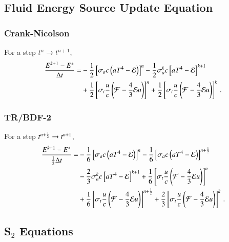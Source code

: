 \documentclass[preprint,12pt]{elsarticle}
\begin{document}
\subsection{Fluid Energy Source Update Equation}
\subsubsection{Crank-Nicolson}
For a step $t^n\rightarrow t^{n+1}$,
\begin{equation}\begin{split}
  \frac{E^{k+1}-E^*}{\Delta t} = &
  -\frac{1}{2}\left[\sigma_{a} c\left(aT^4 - \mathcal{E}\right)\right]^n
  -\frac{1}{2}\sigma_{a}^k c\left[aT^4 - \mathcal{E}\right]^{k+1}\\
  &+\frac{1}{2}\left[\sigma_{t}\frac{u}{c}\left(\mathcal{F}-\frac{4}{3}\mathcal{E} u\right)\right]^n
   +\frac{1}{2}\left[\sigma_t\frac{u}{c}\left(\mathcal{F}-\frac{4}{3}\mathcal{E} u\right)\right]^k
  \, .
\end{split}\end{equation}

\subsubsection{TR/BDF-2}
For a step $t^{n+\frac{1}{2}}\rightarrow t^{n+1}$,
\begin{equation}\begin{split}
  \frac{E^{k+1}-E^*}{\frac{1}{2}\Delta t} = &
  -\frac{1}{6}\left[\sigma_a c\left(aT^4 - \mathcal{E}\right)\right]^n
  -\frac{1}{6}\left[\sigma_a c\left(aT^4 - \mathcal{E}\right)\right]^{n+\frac{1}{2}}\\
  &-\frac{2}{3}\sigma_a^k c\left[aT^4 - \mathcal{E}\right]^{k+1}
   +\frac{1}{6}\left[\sigma_t\frac{u}{c}\left(\mathcal{F}-\frac{4}{3}\mathcal{E} u\right)\right]^n\\
  &+\frac{1}{6}\left[\sigma_t\frac{u}{c}\left(\mathcal{F}-\frac{4}{3}\mathcal{E} u\right)\right]^{n+\frac{1}{2}}
   +\frac{2}{3}\left[\sigma_t\frac{u}{c}\left(\mathcal{F}-\frac{4}{3}\mathcal{E} u\right)\right]^k
  \, .
\end{split}\end{equation}


\subsection{\texorpdfstring{S$_2$}{S-2} Equations}
\end{document}
